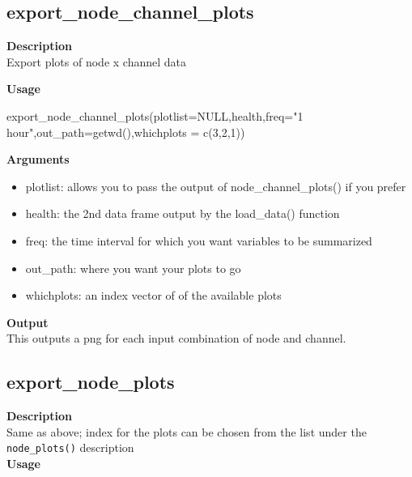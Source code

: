 \documentclass[
]{book}
\newenvironment{Shaded}{\begin{snugshade}}{\end{snugshade}}
\newcommand{\AttributeTok}[1]{\textcolor[rgb]{0.77,0.63,0.00}{#1}}
\newcommand{\ConstantTok}[1]{\textcolor[rgb]{0.00,0.00,0.00}{#1}}
\newcommand{\DecValTok}[1]{\textcolor[rgb]{0.00,0.00,0.81}{#1}}
\newcommand{\FunctionTok}[1]{\textcolor[rgb]{0.00,0.00,0.00}{#1}}
\newcommand{\NormalTok}[1]{#1}
\newcommand{\StringTok}[1]{\textcolor[rgb]{0.31,0.60,0.02}{#1}}
\providecommand{\tightlist}{%
  \setlength{\itemsep}{0pt}\setlength{\parskip}{0pt}}
\begin{document}
\hypertarget{export_node_channel_plots}{%
\subsection{export\_node\_channel\_plots}\label{export_node_channel_plots}}

\textbf{Description}\\
Export plots of node x channel data

\textbf{Usage}

\begin{Shaded}
\begin{Highlighting}[]
\FunctionTok{export\_node\_channel\_plots}\NormalTok{(}\AttributeTok{plotlist=}\ConstantTok{NULL}\NormalTok{,health,}\AttributeTok{freq=}\StringTok{"1 hour"}\NormalTok{,}\AttributeTok{out\_path=}\FunctionTok{getwd}\NormalTok{(),}\AttributeTok{whichplots =} \FunctionTok{c}\NormalTok{(}\DecValTok{3}\NormalTok{,}\DecValTok{2}\NormalTok{,}\DecValTok{1}\NormalTok{))}
\end{Highlighting}
\end{Shaded}

\textbf{Arguments}

\begin{itemize}
\tightlist
\item
  plotlist: allows you to pass the output of node\_channel\_plots() if you prefer\\
\item
  health: the 2nd data frame output by the load\_data() function\\
\item
  freq: the time interval for which you want variables to be summarized\\
\item
  out\_path: where you want your plots to go\\
\item
  whichplots: an index vector of of the available plots
\end{itemize}

\textbf{Output}\\
This outputs a png for each input combination of node and channel.

\hypertarget{export_node_plots}{%
\subsection{export\_node\_plots}\label{export_node_plots}}

\textbf{Description}\\
Same as above; index for the plots can be chosen from the list under the \texttt{node\_plots()} description\\
\textbf{Usage}
\end{document}
